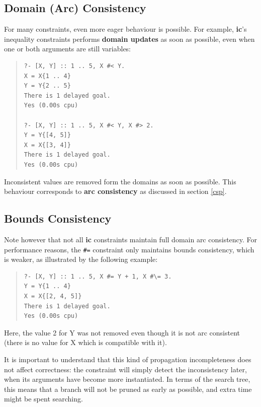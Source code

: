 \subsection{Domain (Arc) Consistency}
For many constraints, even more eager behaviour is possible.
For example, {\bf ic}'s inequality constraints performs {\bf domain updates} as
soon as possible, even when one or both arguments are still variables:
\begin{quote}\begin{verbatim}
?- [X, Y] :: 1 .. 5, X #< Y.
X = X{1 .. 4}
Y = Y{2 .. 5}
There is 1 delayed goal.
Yes (0.00s cpu)

?- [X, Y] :: 1 .. 5, X #< Y, X #> 2.
Y = Y{[4, 5]}
X = X{[3, 4]}
There is 1 delayed goal.
Yes (0.00s cpu)
\end{verbatim}\end{quote}
Inconsistent values are removed form the domains as soon as possible.
This behaviour corresponds to {\bf arc consistency} as discussed in
section \ref{csp}.

\subsection{Bounds Consistency}
Note however that not all {\bf ic} constraints maintain full domain
arc consistency.  For performance reasons, 
the \verb.#=. constraint only maintains bounds consistency, which is
weaker, as illustrated by the following example:
\begin{quote}\begin{verbatim}
?- [X, Y] :: 1 .. 5, X #= Y + 1, X #\= 3.
Y = Y{1 .. 4}
X = X{[2, 4, 5]}
There is 1 delayed goal.
Yes (0.00s cpu)
\end{verbatim}\end{quote}
Here, the value 2 for Y was not removed even though it is not arc consistent
(there is no value for X which is compatible with it).

It is important to understand that this kind of propagation incompleteness
does not affect correctness: the constraint will simply detect the
inconsistency later, when its arguments have become more instantiated.
In terms of the search tree, this means that a branch will not be pruned
as early as possible, and extra time might be spent searching.




